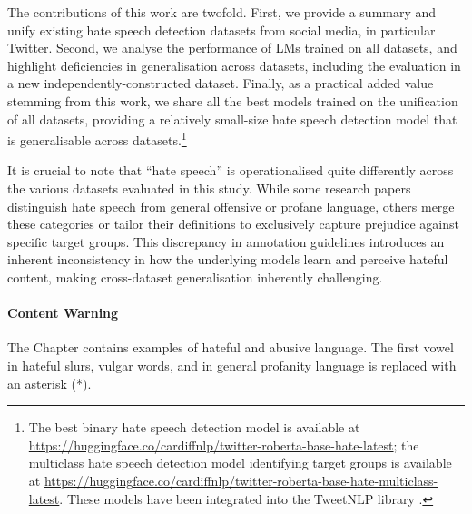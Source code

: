The contributions of this work are twofold. First, we provide a summary and unify existing hate speech detection datasets from social media, in particular Twitter. Second, we analyse the performance of \acp{LM} trained on all datasets, and highlight deficiencies in generalisation across datasets, including the evaluation in a new independently-constructed dataset. Finally, as a practical added value stemming from this work, we share all the best models trained on the unification of all datasets, providing a relatively small-size hate speech detection model that is generalisable across datasets.\footnote{The best binary hate speech detection model is available at \url{https://huggingface.co/cardiffnlp/twitter-roberta-base-hate-latest}; the multiclass hate speech detection model identifying target groups is available at \url{https://huggingface.co/cardiffnlp/twitter-roberta-base-hate-multiclass-latest}. These models have been integrated into the TweetNLP library \cite{camacho2022tweetnlp}.}

It is crucial to note that ``hate speech'' is operationalised quite differently across the various datasets evaluated in this study. While some research papers distinguish hate speech from general offensive or profane language, others merge these categories or tailor their definitions to exclusively capture prejudice against specific target groups. This discrepancy in annotation guidelines introduces an inherent inconsistency in how the underlying models learn and perceive hateful content, making cross-dataset generalisation inherently challenging.

\paragraph{Content Warning} The Chapter contains examples of hateful and abusive language. The first vowel in hateful slurs, vulgar words, and in general profanity language is replaced with an asterisk (*).


